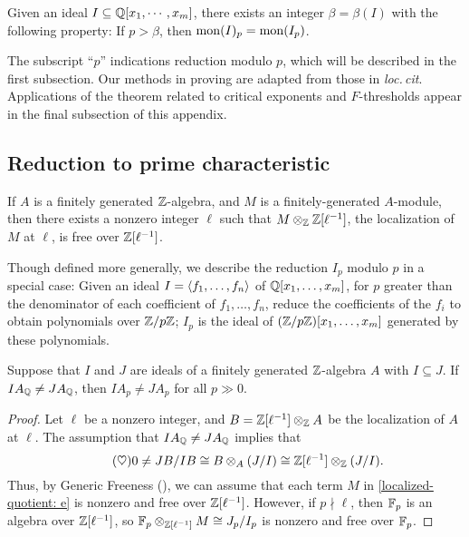 \documentclass[11pt]{amsart}
\begin{document}
\begin{theorem}
\label{mon-operation-modulo-p: T}
Given an ideal $I \subseteq \mathbb{Q}[x_1, \cdots, x_m]$, there exists an integer $\beta = \beta(I)$ with the following property:  If $p > \beta$, then $\operatorname{mon}(I)_p = \operatorname{mon}(I_p)$.
\end{theorem}

The subscript ``$p$'' indications reduction modulo $p$, which will be described in the first subsection. 
Our methods in proving  are adapted from those in \emph{loc.\,cit}.
Applications of the theorem related to critical exponents and $F$-thresholds 
appear in the final subsection of this appendix. 

\subsection{Reduction to prime characteristic}

\begin{remark} \label{generic-freeness} If $A$ is a finitely generated $\mathbb{Z}$-algebra, and $M$ is a finitely-generated $A$-module, then there exists a nonzero integer $\ell$ such that $M \otimes_{\mathbb{Z}} \mathbb{Z}[\ell^{-1}]$, the localization of $M$ at $\ell$, is free over $\mathbb{Z}[\ell^{-1}]$.
\end{remark}

Though defined more generally, we describe the reduction $I_p$ modulo $p$ in a special case: 
Given an ideal $I = \langle f_1, \ldots, f_n \rangle$ of $\mathbb{Q}[x_1, \ldots, x_m]$, for $p$ greater than the denominator of each coefficient of $f_1, \ldots, f_n$, reduce the coefficients of the $f_i$ to obtain polynomials over $\mathbb{Z}/p\mathbb{Z}$; $I_p$ is the ideal of $(\mathbb{Z}/p\mathbb{Z})[x_1, \ldots, x_m]$ generated by these polynomials.

\begin{lemma}
\label{noncontainment mod p: L}
Suppose that $I$ and $J$ are ideals of a finitely generated $\mathbb{Z}$-algebra $A$ with $I \subseteq J$.  If $IA_{\mathbb{Q}} \neq JA_{\mathbb{Q}}$, then $IA_p \neq JA_p$ for all $p \gg 0$.
\end{lemma}

\begin{proof}
Let $\ell$ be a nonzero integer, and $B = \mathbb{Z}[\ell^{-1}] \otimes_{\mathbb{Z}} A$ be the localization of $A$ at $\ell$.  The assumption that $IA_{\mathbb{Q}} \neq JA_{\mathbb{Q}}$ implies that
%
\begin{equation}
\label{localized-quotient: e}
\tag{$\heartsuit$}
0 \neq JB/IB \cong B \otimes_A (J/I) \cong \mathbb{Z}[\ell^{-1}] \otimes_{\mathbb{Z}} (J/I) .
\end{equation}
Thus, by Generic Freeness (), we can assume that each term $M$ in \eqref{localized-quotient: e} is nonzero and free over $\mathbb{Z}[\ell^{-1}]$.  However,  if $p \nmid \ell$, then $\mathbb{F}_p$ is an algebra over $\mathbb{Z}[\ell^{-1}]$, so $\mathbb{F}_p \otimes_{\mathbb{Z}[\ell^{-1}]} M \cong J_p / I_p$ is nonzero and free over $\mathbb{F}_p$.
\end{proof}
\end{document}
